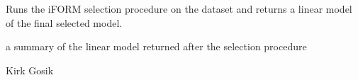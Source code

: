 \documentclass[letterpaper]{book}
\begin{document}
%
\begin{Details}\relax
Runs the iFORM selection procedure on the dataset and returns a linear model
of the final selected model.
\end{Details}
%
\begin{Value}
a summary of the linear model returned after the selection procedure
\end{Value}
%
\begin{Author}\relax
Kirk Gosik
\end{Author}
%
\begin{SeeAlso}\relax
{}
\end{SeeAlso}
\printindex{}
\end{document}
